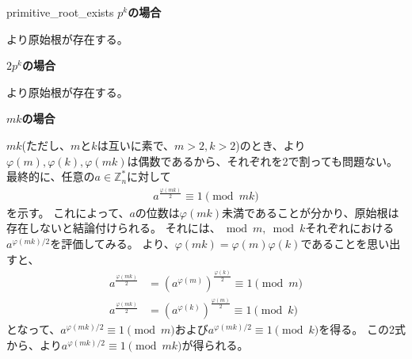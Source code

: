 \begin{prProof}{primitive_root_exists}
\noindent\textbf{$p^k$の場合}

より原始根が存在する。

\noindent\textbf{$2p^k$の場合}

より原始根が存在する。

\noindent\textbf{$mk$の場合}

$mk$(ただし、$m$と$k$は互いに素で、$m>2, k>2$)のとき、より$\varphi(m),\varphi(k),\varphi(mk)$は偶数であるから、それぞれを2で割っても問題ない。
最終的に、任意の$a\in\mathbb{Z}_n^*$に対して
\begin{align*}
a^{\frac{\varphi(mk)}{2}} \equiv 1 \pmod{mk}
\end{align*}
を示す。
これによって、$a$の位数は$\varphi(mk)$未満であることが分かり、原始根は存在しないと結論付けられる。
それには、$\bmod{m},\bmod{k}$それぞれにおける$a^{\varphi(mk)/2}$を評価してみる。
より、$\varphi(mk)=\varphi(m)\varphi(k)$であることを思い出すと、
\begin{align*}
a^{\frac{\varphi(mk)}{2}} &= (a^{\varphi(m)})^{\frac{\varphi(k)}{2}} \equiv 1 \pmod{m}\\
a^{\frac{\varphi(mk)}{2}} &= (a^{\varphi(k)})^{\frac{\varphi(m)}{2}} \equiv 1 \pmod{k}
\end{align*}
となって、$a^{\varphi(mk)/2}\equiv1\pmod{m}$および$a^{\varphi(mk)/2}\equiv1\pmod{k}$を得る。
この2式から、より$a^{\varphi(mk)/2} \equiv 1 \pmod{mk}$が得られる。
\end{prProof}
